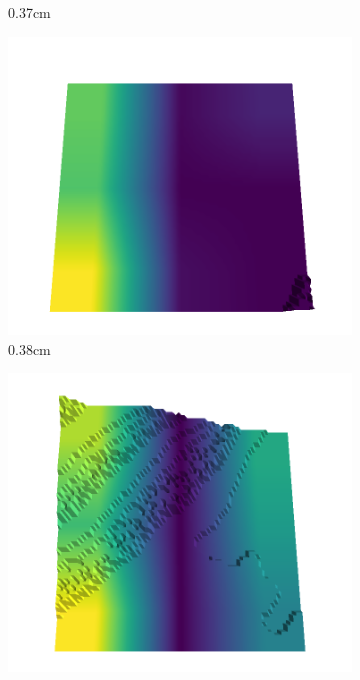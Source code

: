 \documentclass[../document.tex]{subfiles}
\begin{document}
\begin{figure}[H]
\begin{subfigure}[b]{0.242\linewidth}
    \caption{0.37cm}
    \end{subfigure}
    \begin{subfigure}[b]{0.242\linewidth}
    \includegraphics[width=\linewidth]{../img/5/quarry/best/58-patch-3d-majavi-colormap-60.png}
    \caption{0.38cm}
    \end{subfigure}
    \begin{subfigure}[b]{0.242\linewidth}
    \includegraphics[width=\linewidth]{../img/5/quarry/best/60-patch-3d-majavi-colormap-65.png}

\end{subfigure}
\end{figure}
\end{document}
